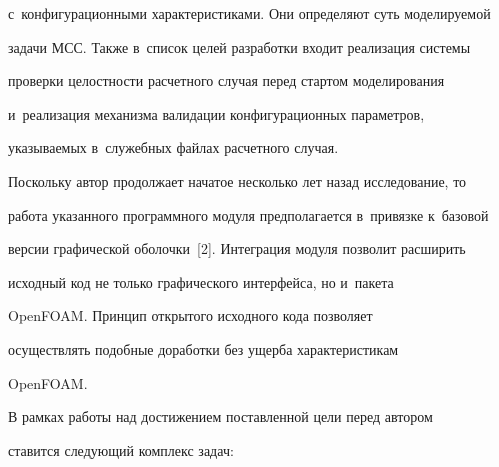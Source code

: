 с~конфигурационными характеристиками. Они определяют суть моделируемой 


задачи МСС. Также в~список целей разработки входит реализация системы 


проверки це\-лост\-ности расчетного случая перед стартом моделирования 


и~реализация механизма валидации конфигурационных па\-ра\-мет\-ров, 


ука\-зы\-ва\-емых в~служебных файлах расчетного случая.


   


   Поскольку автор продолжает начатое несколько лет назад исследование, то 


работа указанного программного модуля предполагается в~привязке к~базовой 


версии графической оболочки~[2]. Интеграция модуля позволит расширить 


исходный код не только графического интерфейса, но и~пакета 


\mbox{OpenFOAM}. Принцип открытого исходного кода позволяет 


осуществлять подобные доработки без ущерба характеристикам 


\mbox{OpenFOAM}.


   


   В рамках работы над достижением поставленной цели перед автором 


ставится следующий комплекс задач: 


